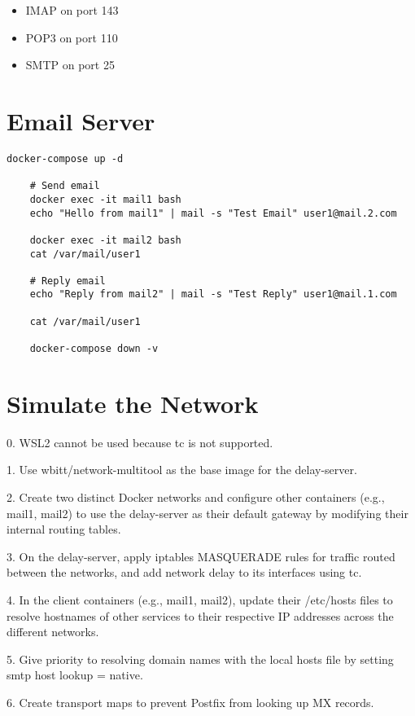 \begin{itemize}
  \item IMAP on port 143
  \item POP3 on port 110
  \item SMTP on port 25
\end{itemize}

\section{Email Server}

\begin{lstlisting}[caption={Run Email Server Using Docker}]
    docker-compose up -d
    
    # Send email
    docker exec -it mail1 bash
    echo "Hello from mail1" | mail -s "Test Email" user1@mail.2.com
    
    docker exec -it mail2 bash
    cat /var/mail/user1
    
    # Reply email
    echo "Reply from mail2" | mail -s "Test Reply" user1@mail.1.com
    
    cat /var/mail/user1
    
    docker-compose down -v
\end{lstlisting}

\section{Simulate the Network}
0. WSL2 cannot be used because tc is not supported.

1. Use wbitt/network-multitool as the base image for the delay-server.

2. Create two distinct Docker networks and configure other containers (e.g., mail1, mail2) to use the delay-server as their default gateway by modifying their internal routing tables.

3. On the delay-server, apply iptables MASQUERADE rules for traffic routed between the networks, and add network delay to its interfaces using tc.

4. In the client containers (e.g., mail1, mail2), update their /etc/hosts files to resolve hostnames of other services to their respective IP addresses across the different networks.

5. Give priority to resolving domain names with the local hosts file by setting smtp host lookup = native.

6. Create transport maps to prevent Postfix from looking up MX records.


